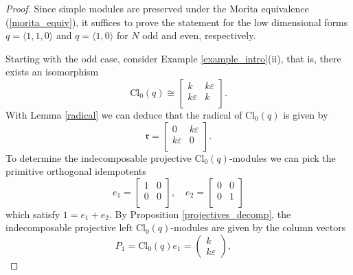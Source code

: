 \documentclass[a4paper, twoside, 11pt]{amsart}
\theoremstyle{definition}
\theoremstyle{remark}
\numberwithin{equation}{theorem}
\newcommand{\evencl}{\mathrm{Cl}_0}
\begin{document}
\begin{proof}
    Since simple modules are preserved under the Morita equivalence (\ref{morita_equiv}), it suffices to prove the statement for the low dimensional forms $q= \langle 1,1,0\rangle$ and $q=\langle 1,0 \rangle$ for $N$ odd and even, respectively. 
    
    Starting with the odd case, consider Example \ref{example_intro}(ii), that is, there exists an isomorphism 
    \begin{equation*}
        \evencl(q) \cong \left[ {\begin{array}{cc}
            k & k\varepsilon \\
            k\varepsilon & k \\
        \end{array} } \right].
    \end{equation*}
    With Lemma \ref{radical} we can deduce that the radical of $\evencl(q)$ is given by 
    \begin{equation*}
        \mathfrak{r} = \left[ {\begin{array}{cc}
            0 & k\varepsilon \\
            k\varepsilon & 0 \\
        \end{array} } \right].
    \end{equation*}
    To determine the indecomposable projective $\evencl(q)$-modules we can pick the primitive orthogonal idempotents 
    \begin{equation*}
        e_1 = \left[ {\begin{array}{cc}
            1 & 0 \\
            0 & 0 \\
        \end{array} } \right], \quad 
        e_2 = \left[ {\begin{array}{cc}
            0 & 0 \\
            0 & 1 \\
        \end{array} } \right] 
    \end{equation*}
    which satisfy $1 = e_1 + e_2$. By Proposition \ref{projectives_decomp}, the indecomposable projective left $\evencl(q)$-modules are given by the column vectors 
    \begin{equation*}
        P_1 = \evencl(q)e_1 = \begin{pmatrix}k\\k\varepsilon\end{pmatrix},  \quad 

\end{equation*}
\end{proof}
\end{document}
